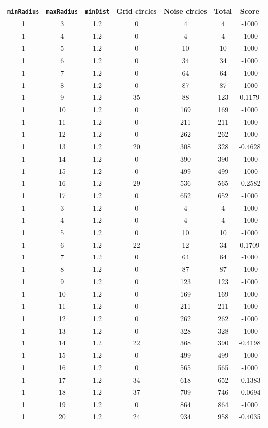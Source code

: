 \documentclass[letterpaper, 12pt]{article}
\begin{document}
\begin{longtable}{|c|c|c|c|c|c|c|}
\hline
\textbf{\texttt{minRadius}} & \textbf{\texttt{maxRadius}} & \textbf{\texttt{minDist}} & \textbf{Grid circles} & \textbf{Noise circles} & \textbf{Total} & \textbf{Score} \\
\hline
1 & 3 & 1.2 & 0 & 4 & 4 & -1000 \\
\hline
1 & 4 & 1.2 & 0 & 4 & 4 & -1000 \\
\hline
1 & 5 & 1.2 & 0 & 10 & 10 & -1000 \\
\hline
1 & 6 & 1.2 & 0 & 34 & 34 & -1000 \\
\hline
1 & 7 & 1.2 & 0 & 64 & 64 & -1000 \\
\hline
1 & 8 & 1.2 & 0 & 87 & 87 & -1000 \\
\hline
1 & 9 & 1.2 & 35 & 88 & 123 & 0.1179 \\
\hline
1 & 10 & 1.2 & 0 & 169 & 169 & -1000 \\
\hline
1 & 11 & 1.2 & 0 & 211 & 211 & -1000 \\
\hline
1 & 12 & 1.2 & 0 & 262 & 262 & -1000 \\
\hline
1 & 13 & 1.2 & 20 & 308 & 328 & -0.4628 \\
\hline
1 & 14 & 1.2 & 0 & 390 & 390 & -1000 \\
\hline
1 & 15 & 1.2 & 0 & 499 & 499 & -1000 \\
\hline
1 & 16 & 1.2 & 29 & 536 & 565 & -0.2582 \\
\hline
1 & 17 & 1.2 & 0 & 652 & 652 & -1000 \\
\hline
1 & 3 & 1.2 & 0 & 4 & 4 & -1000 \\
\hline
1 & 4 & 1.2 & 0 & 4 & 4 & -1000 \\
\hline
1 & 5 & 1.2 & 0 & 10 & 10 & -1000 \\
\hline
1 & 6 & 1.2 & 22 & 12 & 34 & 0.1709 \\
\hline
1 & 7 & 1.2 & 0 & 64 & 64 & -1000 \\
\hline
1 & 8 & 1.2 & 0 & 87 & 87 & -1000 \\
\hline
1 & 9 & 1.2 & 0 & 123 & 123 & -1000 \\
\hline
1 & 10 & 1.2 & 0 & 169 & 169 & -1000 \\
\hline
1 & 11 & 1.2 & 0 & 211 & 211 & -1000 \\
\hline
1 & 12 & 1.2 & 0 & 262 & 262 & -1000 \\
\hline
1 & 13 & 1.2 & 0 & 328 & 328 & -1000 \\
\hline
1 & 14 & 1.2 & 22 & 368 & 390 & -0.4198 \\
\hline
1 & 15 & 1.2 & 0 & 499 & 499 & -1000 \\
\hline
1 & 16 & 1.2 & 0 & 565 & 565 & -1000 \\
\hline
1 & 17 & 1.2 & 34 & 618 & 652 & -0.1383 \\
\hline
1 & 18 & 1.2 & 37 & 709 & 746 & -0.0694 \\
\hline
1 & 19 & 1.2 & 0 & 864 & 864 & -1000 \\
\hline
1 & 20 & 1.2 & 24 & 934 & 958 & -0.4035 \\
\hline
\end{longtable}
\end{document}
